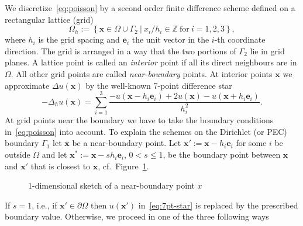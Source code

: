 We discretize~\eqref{eq:poisson} by a second order finite difference
scheme defined on a rectangular lattice (grid)
\begin{displaymath}
  \Omega_h:=\left\{ \mathbf{x} \in {\Omega}\cup\Gamma_2 \ |\ x_i/h_i \in
    \mathbb{Z} \ \mbox{for}\ i=1,2,3 \right\},
\end{displaymath}
where $h_i$ is the grid spacing and $\mathbf{e}_i$ the unit vector in the $i$-th coordinate direction. The
grid is arranged in a way that the two portions of $\Gamma_2$ lie in
grid planes.  A lattice point is called an \emph{interior} point if all
its direct neighbours are in $\Omega$.  All other grid points are called
\emph{near-boundary} points.  At interior points $\mathbf{x}$ we
approximate $\Delta u (\mathbf{x})$ by the well-known 7-point difference
star
\begin{equation}  \label{eq:7pt-star}
  -\Delta_h u(\mathbf{x}) = 
  \sum_{i=1}^3
  \frac{-u(\mathbf{x}\!-\!h_i\mathbf{e}_i) + 2 u(\mathbf{x})
  - u(\mathbf{x}\!+\!h_i\mathbf{e}_i)}{h_i^2}.
\end{equation}
At grid points near the boundary we have to take the boundary conditions
in~\eqref{eq:poisson} into account.  To explain the schemes on the
Dirichlet (or PEC) boundary $\Gamma_1$ let $\mathbf{x}$ be a
near-boundary point.  Let $\mathbf{x}' := \mathbf{x} - h_i\mathbf{e}_i$
for some $i$ be outside $\Omega$ and let $\mathbf{x}^* := \mathbf{x} - s
h_i\mathbf{e}_i$, $0<s\le1$, be the boundary point between $\mathbf{x}$
and $\mathbf{x}'$ that is closest to $\mathbf{x}$,
cf.~Figure~\ref{fig:boundary}.
\begin{figure}[htb]
  \centering
  
  \caption{1-dimensional sketch of a near-boundary point $x$}
  \label{fig:boundary}
\end{figure}
If $s=1$, i.e., if $\mathbf{x}'\in \partial\Omega$ then $u(\mathbf{x}')$
in~\eqref{eq:7pt-star} is replaced by the prescribed boundary value.
Otherwise, we proceed in one of the three following ways~\cite{fowa:60,
  hack:94}
